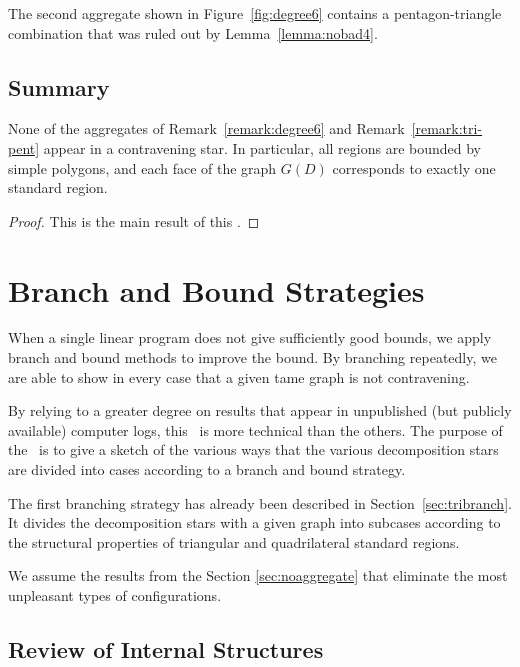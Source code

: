 The second aggregate shown in Figure~\ref{fig:degree6} contains a
pentagon-triangle combination that was ruled out by
Lemma~\ref{lemma:nobad4}.

\section{Summary}

\begin{lemma}
None of the aggregates of Remark~\ref{remark:degree6} and
Remark~\ref{remark:tri-pent} appear in a contravening star.  In
particular, all regions are bounded by simple polygons, and each
face of the graph $G(D)$ corresponds to exactly one standard
region.
\end{lemma}

\begin{proof} This is the main result of this \chap.
\end{proof}



\chapter{Branch and Bound Strategies} %
\label{sec:branchbound}

When a single linear program does not give sufficiently good
bounds, we apply branch and bound methods to improve the bound. By
branching repeatedly, we are able to show in every case that a
given tame graph is not contravening.

By relying to a greater degree  on results that appear in
unpublished (but publicly available) computer logs, this \chap\ is
more technical than the others.  The purpose of the \chap\ is to
give a sketch of the various ways that the various decomposition
stars are divided into cases according to a branch and bound
strategy.  


The first branching strategy has already been described in
Section~\ref{sec:tribranch}.  It divides the decomposition stars
with a given graph into subcases according to the structural
properties of triangular and quadrilateral standard regions.

We assume the results from the Section \ref{sec:noaggregate} that
eliminate the most unpleasant types of configurations.

\section{Review of Internal Structures}

